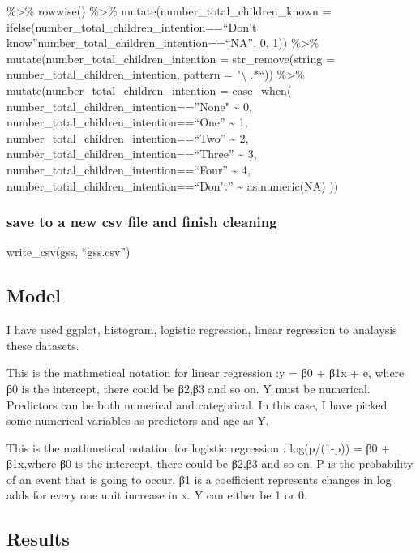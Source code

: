 \documentclass[
]{article}
\begin{document}
\%\textgreater\% rowwise() \%\textgreater\%
mutate(number\_total\_children\_known =
ifelse(number\_total\_children\_intention==``Don't
know''\textbar number\_total\_children\_intention==``NA'', 0, 1))
\%\textgreater\% mutate(number\_total\_children\_intention =
str\_remove(string = number\_total\_children\_intention, pattern =
"\textbackslash{} .*``)) \%\textgreater\%
mutate(number\_total\_children\_intention = case\_when(
number\_total\_children\_intention==''None" \textasciitilde{} 0,
number\_total\_children\_intention==``One'' \textasciitilde{} 1,
number\_total\_children\_intention==``Two'' \textasciitilde{} 2,
number\_total\_children\_intention==``Three'' \textasciitilde{} 3,
number\_total\_children\_intention==``Four'' \textasciitilde{} 4,
number\_total\_children\_intention==``Don't'' \textasciitilde{}
as.numeric(NA) ))

\hypertarget{save-to-a-new-csv-file-and-finish-cleaning}{%
\subsubsection{save to a new csv file and finish
cleaning}\label{save-to-a-new-csv-file-and-finish-cleaning}}

write\_csv(gss, ``gss.csv'')

\hypertarget{model}{%
\subsection{Model}\label{model}}

I have used ggplot, histogram, logistic regression, linear regression to
analaysis these datasets.

This is the mathmetical notation for linear regression :y = β0 + β1x +
e, where β0 is the intercept, there could be β2,β3 and so on. Y must be
numerical. Predictors can be both numerical and categorical. In this
case, I have picked some numerical variables as predictors and age as Y.

This is the mathmetical notation for logistic regression : log(p/(1-p))
= β0 + β1x,where β0 is the intercept, there could be β2,β3 and so on. P
is the probability of an event that is going to occur. β1 is a
coefficient represents changes in log adds for every one unit increase
in x. Y can either be 1 or 0.

\hypertarget{results}{%
\subsection{Results}\label{results}}
\end{document}
